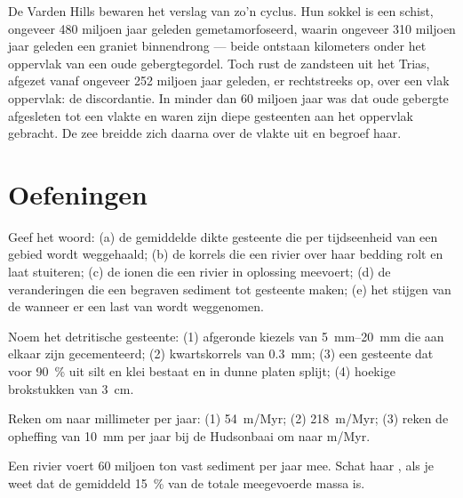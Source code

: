 De Varden Hills bewaren het verslag van zo'n cyclus. Hun sokkel is een schist,
ongeveer 480 miljoen jaar geleden gemetamorfoseerd, waarin ongeveer 310 miljoen jaar geleden een graniet
binnendrong --- beide ontstaan kilometers onder het oppervlak van
een oude gebergtegordel. Toch rust de zandsteen uit het Trias, afgezet vanaf ongeveer 252
miljoen jaar geleden, er rechtstreeks op, over een vlak oppervlak: de
discordantie. In minder dan 60 miljoen jaar was dat oude gebergte afgesleten
tot een vlakte en waren zijn diepe gesteenten aan het oppervlak gebracht. De zee
breidde zich daarna over de vlakte uit en begroef haar.

\section{Oefeningen}

\begin{exercise}[$\star$]\label{exo:g12:destruction-of-mountains:1}
Geef het woord: (a) de gemiddelde dikte gesteente die per tijdseenheid van een gebied wordt
weggehaald; (b) de korrels die een rivier over haar bedding rolt en laat stuiteren; (c) de
ionen die een rivier in oplossing meevoert; (d) de veranderingen die een begraven sediment
tot gesteente maken; (e) het stijgen van de  wanneer er een last van wordt weggenomen.
\end{exercise}

\begin{exercise}[$\star$]\label{exo:g12:destruction-of-mountains:2}
Noem het detritische gesteente: (1) afgeronde kiezels van \qtyrange{5}{20}{mm}
die aan elkaar zijn gecementeerd; (2) kwartskorrels van \qty{0.3}{mm}; (3) een gesteente dat
voor \qty{90}{\percent} uit silt en klei bestaat en in dunne platen splijt; (4) hoekige
brokstukken van \qty{3}{cm}.
\end{exercise}

\begin{exercise}[$\star$]\label{exo:g12:destruction-of-mountains:3}
Reken om naar millimeter per jaar: (1) \qty{54}{m/Myr}; (2) \qty{218}{m/Myr};
(3) reken de opheffing van \qty{10}{mm} per jaar bij de Hudsonbaai om naar \unit{m/Myr}.
\end{exercise}

\begin{exercise}[$\star$]\label{exo:g12:destruction-of-mountains:4}
Een rivier voert 60 miljoen ton vast sediment per jaar mee. Schat haar
, als je weet dat de  gemiddeld
\qty{15}{\percent} van de totale meegevoerde massa is.
\end{exercise}

